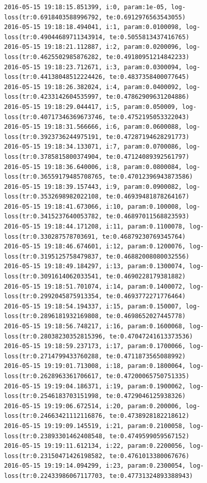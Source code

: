 \documentclass[11pt]{article}
\begin{document}
    \begin{Verbatim}[commandchars=\\\{\}]
2016-05-15 19:18:15.851399, i:0, param:1e-05, log-loss(tr:0.6918403588996792, te:0.6912976563543055)
2016-05-15 19:18:18.494041, i:1, param:0.0100098, log-loss(tr:0.49044689711343914, te:0.5055813437416765)
2016-05-15 19:18:21.112887, i:2, param:0.0200096, log-loss(tr:0.4625502985876282, te:0.49180951214842233)
2016-05-15 19:18:23.712671, i:3, param:0.0300094, log-loss(tr:0.44138048512224426, te:0.4837358400077645)
2016-05-15 19:18:26.382024, i:4, param:0.0400092, log-loss(tr:0.4233142604535997, te:0.47862909631204886)
2016-05-15 19:18:29.044417, i:5, param:0.050009, log-loss(tr:0.40717346369673746, te:0.4752195053322043)
2016-05-15 19:18:31.566666, i:6, param:0.0600088, log-loss(tr:0.3923736244975191, te:0.47287194628291773)
2016-05-15 19:18:34.133071, i:7, param:0.0700086, log-loss(tr:0.3785815800374904, te:0.47124089392561797)
2016-05-15 19:18:36.640006, i:8, param:0.0800084, log-loss(tr:0.36559179485708765, te:0.47012396943873586)
2016-05-15 19:18:39.157443, i:9, param:0.0900082, log-loss(tr:0.3532698982022108, te:0.46939481878264167)
2016-05-15 19:18:41.673066, i:10, param:0.100008, log-loss(tr:0.3415237640053782, te:0.46897011568823593)
2016-05-15 19:18:44.171208, i:11, param:0.1100078, log-loss(tr:0.330287578703691, te:0.46879230769345764)
2016-05-15 19:18:46.674601, i:12, param:0.1200076, log-loss(tr:0.3195125758479837, te:0.46882008080032556)
2016-05-15 19:18:49.184297, i:13, param:0.1300074, log-loss(tr:0.3091614062033541, te:0.4690228179381882)
2016-05-15 19:18:51.701074, i:14, param:0.1400072, log-loss(tr:0.2992045875913354, te:0.4693772271776464)
2016-05-15 19:18:54.194337, i:15, param:0.150007, log-loss(tr:0.2896181932169808, te:0.4698652027445778)
2016-05-15 19:18:56.748217, i:16, param:0.1600068, log-loss(tr:0.28038230352815396, te:0.47047241613373536)
2016-05-15 19:18:59.237173, i:17, param:0.1700066, log-loss(tr:0.2714799433760288, te:0.4711873565088992)
2016-05-15 19:19:01.713008, i:18, param:0.1800064, log-loss(tr:0.2628963361706617, te:0.47200065750751335)
2016-05-15 19:19:04.186371, i:19, param:0.1900062, log-loss(tr:0.2546183703151998, te:0.4729046125938326)
2016-05-15 19:19:06.672514, i:20, param:0.200006, log-loss(tr:0.24663421112116876, te:0.4738928182218612)
2016-05-15 19:19:09.145519, i:21, param:0.2100058, log-loss(tr:0.23893301462408548, te:0.4749599059567152)
2016-05-15 19:19:11.612134, i:22, param:0.2200056, log-loss(tr:0.23150471426198582, te:0.4761013380067676)
2016-05-15 19:19:14.094299, i:23, param:0.2300054, log-loss(tr:0.22433986067117703, te:0.47731324893388943)

\end{Verbatim}
\end{document}

